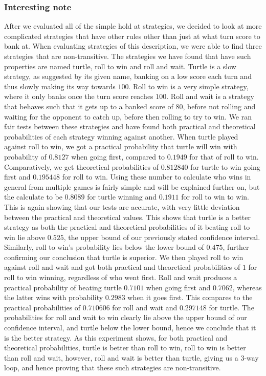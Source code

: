 \documentclass[a4paper,titlepage]{article}
\begin{document}
\subsubsection{Interesting note}
After we evaluated all of the simple hold at strategies, we decided to look at more complicated strategies that have other rules other than just at what turn score to bank at. When evaluating strategies of this description, we were able to find three strategies that are non-transitive. The strategies we have found that have such properties are named turtle, roll to win and roll and wait. Turtle is a slow strategy, as suggested by its given name, banking on a low score each turn and thus slowly making its way towards $100$. Roll to win is a very simple strategy, where it only banks once the turn score reaches $100$. Roll and wait is a strategy that behaves such that it gets up to a banked score of $80$, before not rolling and waiting for the opponent to catch up, before then rolling to try to win. We ran fair tests between these strategies and have found both practical and theoretical probabilities of each strategy winning against another. When turtle played against roll to win, we got a practical probability that turtle will win with probability of $0.8127$ when going first, compared to $0.1949$ for that of roll to win. Comparatively, we get theoretical probabilities of $0.812840$ for turtle to win going first and $0.195448$ for roll to win. Using these number to calculate who wins in general from multiple games is fairly simple and will be explained further on, but the calculate to be $0.8089$ for turtle winning and $0.1911$ for roll to win to win. This is again showing that our tests are accurate, with very little deviation between the practical and theoretical values. This shows that turtle is a better strategy as both the practical and theoretical probabilities of it beating roll to win lie above $0.525$, the upper bound of our previously stated confidence interval. Similarly, roll to win’s probability lies below the lower bound of $0.475$, further confirming our conclusion that turtle is superior. We then played roll to win against roll and wait and got both practical and theoretical probabilities of $1$ for roll to win winning, regardless of who went first. Roll and wait produces a practical probability of beating turtle $0.7101$ when going first and $0.7062$, whereas the latter wins with probability $0.2983$ when it goes first. This compares to the practical probabilities of $0.710606$ for roll and wait and $0.297148$ for turtle. The probabilities for roll and wait to win clearly lie above the upper bound of our confidence interval, and turtle below the lower bound, hence we conclude that it is the better strategy. As this experiment shows, for both practical and theoretical probabilities, turtle is better than roll to win, roll to win is better than roll and wait, however, roll and wait is better than turtle, giving us a 3-way loop, and hence proving that these such strategies are non-transitive.\\ \\
\end{document}

